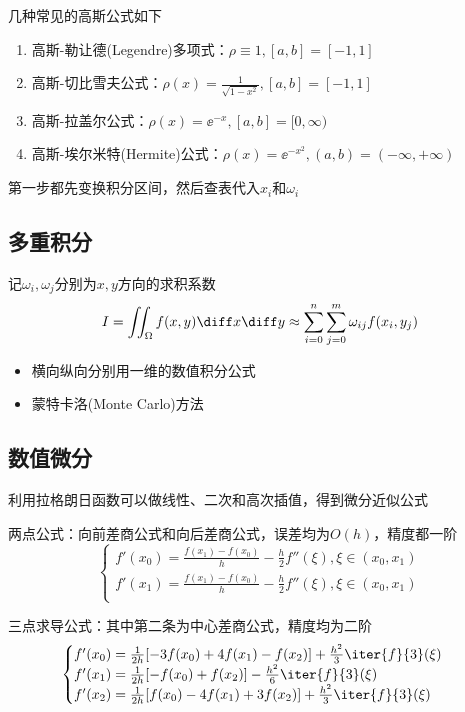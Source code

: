 几种常见的高斯公式如下
\begin{enumerate}
    \item 高斯-勒让德(Legendre)多项式：$\rho\equiv 1,[a,b]=[-1,1]$
    \item 高斯-切比雪夫公式：$\rho(x)=\frac{1}{\sqrt{1-x^2}},[a,b]=[-1,1]$
    \item 高斯-拉盖尔公式：$\rho(x)=\ee^{-x},[a,b]=[0,\infty)$
    \item 高斯-埃尔米特(Hermite)公式：$\rho(x)=\ee^{-x^2},(a,b)=(-\infty,+\infty)$
\end{enumerate}
第一步都先变换积分区间，然后查表代入$x_i$和$\omega_i$

\subsection{多重积分}
记$\omega_i,\omega_j$分别为$x,y$方向的求积系数
\[I=\iint_\Omega f(x,y)\diff x\diff y\approx\sum_{i=0}^n\sum_{j=0}^m\omega_{ij}f(x_i,y_j)\]

\begin{itemize}
    \item 横向纵向分别用一维的数值积分公式
    \item 蒙特卡洛(Monte Carlo)方法
\end{itemize}

\subsection{数值微分}
利用拉格朗日函数可以做线性、二次和高次插值，得到微分近似公式

两点公式：向前差商公式和向后差商公式，误差均为$O(h)$，精度都一阶
\[\begin{cases}
    f'(x_0)=\frac{f(x_1)-f(x_0)}{h}-\frac{h}{2}f''(\xi),\xi\in(x_0,x_1)\\
    f'(x_1)=\frac{f(x_1)-f(x_0)}{h}-\frac{h}{2}f''(\xi),\xi\in(x_0,x_1)\\
\end{cases}\]

三点求导公式：其中第二条为中心差商公式，精度均为二阶
\[\begin{cases}
    f'(x_0)=\frac{1}{2h}[-3f(x_0)+4f(x_1)-f(x_2)]+\frac{h^2}{3}\iter{f}{3}(\xi)\\
    f'(x_1)=\frac{1}{2h}[-f(x_0)+f(x_2)]-\frac{h^2}{6}\iter{f}{3}(\xi)\\
    f'(x_2)=\frac{1}{2h}[f(x_0)-4f(x_1)+3f(x_2)]+\frac{h^2}{3}\iter{f}{3}(\xi)
\end{cases}\]
